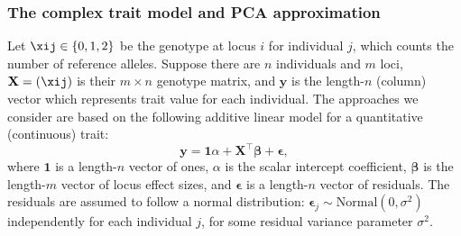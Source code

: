 \documentclass[11pt]{article}
\begin{document}
\subsubsection{The complex trait model and PCA approximation}

Let $\xij \in \{ 0, 1, 2 \}$ be the genotype at locus $i$ for individual $j$, which counts the number of reference alleles.
Suppose there are $n$ individuals and $m$ loci,
$\mathbf{X} = ( \xij )$ is their $m \times n$ genotype matrix, and
$\mathbf{y}$ is the length-$n$ (column) vector which represents trait value for each individual.
The approaches we consider are based on the following additive linear model for a quantitative (continuous) trait:
\begin{equation}
  \label{eq:trait}
  \mathbf{y}
  =
  \mathbf{1} \alpha + \mathbf{X}^\intercal \mathbf{\beta} + \mathbf{\epsilon}
  ,
\end{equation}
where
$\mathbf{1}$ is a length-$n$ vector of ones,
$\alpha$ is the scalar intercept coefficient,
$\mathbf{\beta}$ is the length-$m$ vector of locus effect sizes, and
$\mathbf{\epsilon}$ is a length-$n$ vector of residuals.
The residuals are assumed to follow a normal distribution: $\mathbf{\epsilon}_j \sim \text{Normal}(0, \sigma^2)$ independently for each individual $j$, for some residual variance parameter $\sigma^2$.
\end{document}
